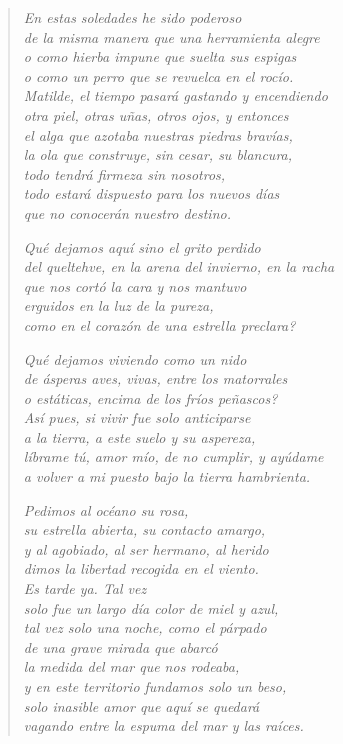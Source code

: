 \documentclass[12pt]{article}
\begin{document}
\clearpage
{}
\begin{verse}

\emph{En estas soledades he sido poderoso\\
de la misma manera que una herramienta alegre\\
o como hierba impune que suelta sus espigas\\
o como un perro que se revuelca en el rocío.\\
Matilde, el tiempo pasará gastando y encendiendo\\
otra piel, otras uñas, otros ojos, y entonces\\
el alga que azotaba nuestras piedras bravías,\\
la ola que construye, sin cesar, su blancura,\\
todo tendrá firmeza sin nosotros,\\
todo estará dispuesto para los nuevos días\\
que no conocerán nuestro destino.}  

\emph{Qué dejamos aquí sino el grito perdido\\
del queltehve, en la arena del invierno, en la racha\\
que nos cortó la cara y nos mantuvo\\
erguidos en la luz de la pureza,\\
como en el corazón de una estrella preclara?}

\emph{Qué dejamos viviendo como un nido\\
de ásperas aves, vivas, entre los matorrales\\
o estáticas, encima de los fríos peñascos?\\
Así pues, si vivir fue solo anticiparse\\
a la tierra, a este suelo y su aspereza,\\
líbrame tú, amor mío, de no cumplir, y ayúdame\\
a volver a mi puesto bajo la tierra hambrienta.}  

\emph{Pedimos al océano su rosa,\\
su estrella abierta, su contacto amargo,\\
y al agobiado, al ser hermano, al herido\\
dimos la libertad recogida en el viento.\\
Es tarde ya. Tal vez\\
solo fue un largo día color de miel y azul,\\
tal vez solo una noche, como el párpado\\
de una grave mirada que abarcó\\
la medida del mar que nos rodeaba,\\
y en este territorio fundamos solo un beso,\\
solo inasible amor que aquí se quedará\\
vagando entre la espuma del mar y las raíces.}

\end{verse}
\end{document}
